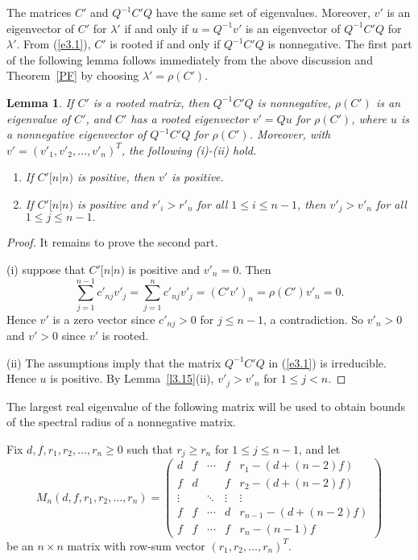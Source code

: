 \documentclass[final,3p, times, 12pt]{elsarticle}
\theoremstyle{plain}
\newtheorem{lem}[thm]{Lemma}
\theoremstyle{definition}
\theoremstyle{remark}
\numberwithin{equation}{section}
\begin{document}
The matrices $C'$ and $Q^{-1}C'Q$ have the same set of eigenvalues. Moreover, $v'$ is an eigenvector of $C'$ for $\lambda'$ if and only if $u=Q^{-1}v'$ is an eigenvector of $Q^{-1}C'Q$ for $\lambda'$. From (\ref{e3.1}),
  $C'$ is rooted if and only if $Q^{-1}C'Q$ is nonnegative.
The first part of the following lemma follows immediately from the above discussion and Theorem~\ref{PF} by choosing $\lambda'=\rho(C')$.




\begin{lem}\label{l5.3}
If $C'$ is a rooted matrix, then $Q^{-1}C'Q$ is nonnegative, $\rho(C')$ is an eigenvalue of $C'$,
and $C'$ has a rooted eigenvector $v'=Qu$ for $\rho(C')$,
where $u$ is a nonnegative eigenvector of $Q^{-1}C'Q$ for $\rho(C')$.
Moreover, with $v'=(v'_1, v'_2, \ldots, v'_n)^T$,  the following (i)-(ii) hold.
\begin{enumerate}
\item[(i)] If $C' [n|n)$ is positive, then $v'$ is positive.
\item[(ii)] If  $C' [n|n)$ is positive and  $r'_i> r'_n$ for all $1\leq i\leq n-1$, then $v'_j>v'_n$ for all $1\leq j\leq n-1.$
\end{enumerate}
\end{lem}
\begin{proof}
It remains to prove the second part.

(i) suppose that $C' [n|n)$ is positive and $v'_n=0$. Then
$$\sum_{j=1}^{n-1}c'_{nj}v'_j=\sum_{j=1}^nc'_{nj}v'_j=(C'v')_n=\rho(C')v'_n=0.$$
Hence $v'$ is a zero vector since $c'_{nj}>0$ for $j\leq n-1$, a contradiction. So $v'_n>0$ and $v'>0$ since $v'$ is rooted.


(ii) The assumptions imply that the matrix $Q^{-1}C'Q$ in (\ref{e3.1}) is irreducible.
Hence $u$ is positive. By Lemma~\ref{l3.15}(ii), $v'_j>v'_n$ for $1\leq j<n.$
\end{proof}


The largest real eigenvalue of the following matrix will be used to obtain  bounds of the spectral radius of a nonnegative matrix.

Fix  $d,f,r_1,r_2,\ldots,r_n\geq 0$ such that $r_j\geq r_n$ for $1\leq j\leq n-1$, and let
\begin{equation}\label{ee5.2}
M_n(d, f, r_1, r_2, \ldots, r_n)=
\begin{pmatrix}
d & f &  \cdots & f & r_{1}-(d+(n-2)f) \\
f & d &   & f & r_{2}-(d+(n-2)f) \\
\vdots &  & \ddots & \vdots & \vdots \\
f & f & \cdots  & d & r_{n-1}-(d+(n-2)f)\\
f & f & \cdots & f & r_{n}-(n-1)f
\end{pmatrix}
\end{equation} be an $n\times n$ matrix with row-sum vector $(r_1, r_2, \ldots, r_n)^T$.
\end{document}
